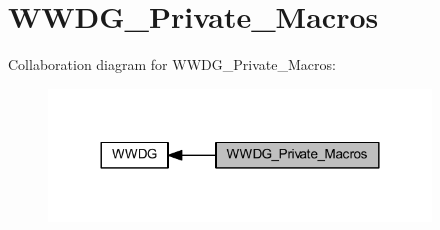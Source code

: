 \hypertarget{group___w_w_d_g___private___macros}{}\section{W\+W\+D\+G\+\_\+\+Private\+\_\+\+Macros}
\label{group___w_w_d_g___private___macros}
Collaboration diagram for W\+W\+D\+G\+\_\+\+Private\+\_\+\+Macros\+:
\nopagebreak
\begin{figure}[H]
\begin{center}
\leavevmode
\includegraphics[width=288pt]{group___w_w_d_g___private___macros}
\end{center}
\end{figure}
